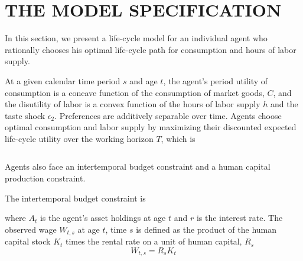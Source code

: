 \documentclass[\econtexRoot/ImaiKeane]{subfiles}
\begin{document}
\section{THE MODEL SPECIFICATION}
\label{section:model}
In this section, we present a life-cycle model for an individual agent who rationally chooses his optimal life-cycle path for consumption and hours of labor supply. \par
At a given calendar time period $s$ and age $t$, the agent's period utility of consumption is a concave function of the consumption of market goods, $C$, and the disutility of labor is a convex function of the hours of labor supply $h$ and the taste shock $\epsilon_2$. Preferences are additively separable over time. Agents choose optimal consumption and labor supply by maximizing their discounted expected life-cycle
utility over the working horizon $T$, which is

\begin{equation} \tag{1}
\label{eq:LCU}

\end{equation}

Agents also face an intertemporal budget constraint and a human capital production constraint. \par
The intertemporal budget constraint is
\begin{equation} \tag{2}
  \label{eq:IBC}

\end{equation}

where $A_t$ is the agent's asset holdings at age $t$ and $r$ is the interest rate. The observed wage $W_{t,s}$ at age $t$, time $s$ is defined as the product of the human capital stock $K_t$ times the rental rate on a unit of human capital, $R_s$
\begin{equation} \tag{3}
W_{t,s}=R_sK_t
\end{equation}
\end{document}
